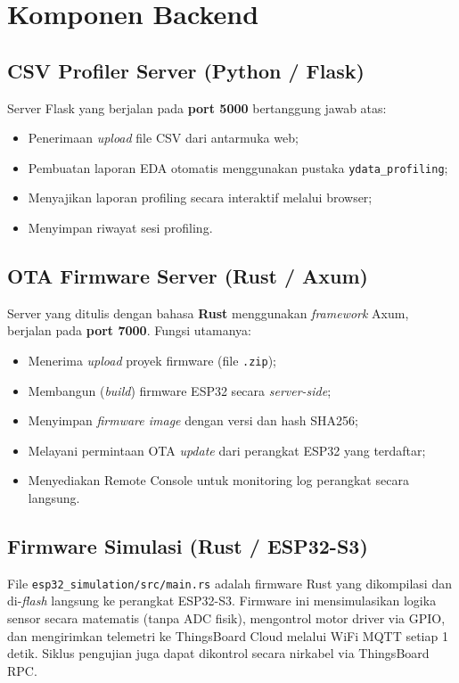 \documentclass[12pt,a4paper]{report}
\begin{document}
\section{Komponen Backend}

\subsection{CSV Profiler Server (Python / Flask)}

Server Flask yang berjalan pada \textbf{port 5000} bertanggung jawab atas:
\begin{itemize}[leftmargin=2cm, itemsep=2pt]
  \item Penerimaan \textit{upload} file CSV dari antarmuka web;
  \item Pembuatan laporan EDA otomatis menggunakan pustaka \texttt{ydata\_profiling};
  \item Menyajikan laporan profiling secara interaktif melalui browser;
  \item Menyimpan riwayat sesi profiling.
\end{itemize}

\subsection{OTA Firmware Server (Rust / Axum)}

Server yang ditulis dengan bahasa \textbf{Rust} menggunakan \textit{framework}
Axum, berjalan pada \textbf{port 7000}. Fungsi utamanya:
\begin{itemize}[leftmargin=2cm, itemsep=2pt]
  \item Menerima \textit{upload} proyek firmware (file \texttt{.zip});
  \item Membangun (\textit{build}) firmware ESP32 secara \textit{server-side};
  \item Menyimpan \textit{firmware image} dengan versi dan hash SHA256;
  \item Melayani permintaan OTA \textit{update} dari perangkat ESP32 yang terdaftar;
  \item Menyediakan Remote Console untuk monitoring log perangkat secara langsung.
\end{itemize}

\subsection{Firmware Simulasi (Rust / ESP32-S3)}

File \texttt{esp32\_simulation/src/main.rs} adalah firmware Rust yang dikompilasi
dan di-\textit{flash} langsung ke perangkat ESP32-S3. Firmware ini mensimulasikan
logika sensor secara matematis (tanpa ADC fisik), mengontrol motor driver via GPIO,
dan mengirimkan telemetri ke ThingsBoard Cloud melalui WiFi MQTT setiap 1 detik.
Siklus pengujian juga dapat dikontrol secara nirkabel via ThingsBoard RPC.
\end{document}
